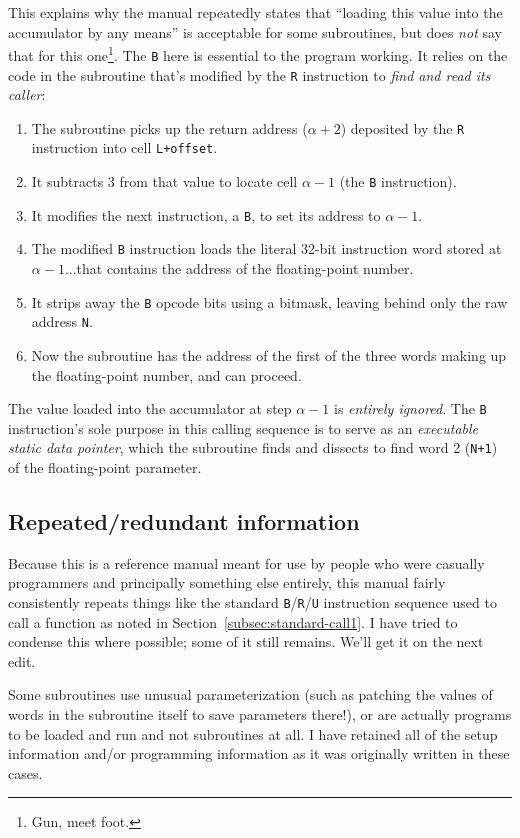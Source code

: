 This explains why the manual repeatedly states that ``loading this value into the accumulator by any means'' is acceptable for some subroutines, but does \emph{not} say that for this one\footnote{Gun, meet foot.}. The \texttt{B} here is essential to the program working. It relies on the code in the subroutine that's modified by the \texttt{R} instruction to \emph{find and read its caller}:
\begin{enumerate}
    \item The subroutine picks up the return address ($\alpha+2$) deposited by the \texttt{R} instruction into cell \texttt{L+offset}.
    \item It subtracts 3 from that value to locate cell $\alpha-1$ (the \texttt{B} instruction).
	\item It modifies the next instruction, a \texttt{B}, to set its address to $\alpha-1$.
    \item The modified \texttt{B} instruction loads the literal 32-bit instruction word stored at $\alpha-1$...that contains the address of the floating-point number.
    \item It strips away the \texttt{B} opcode bits using a bitmask, leaving behind only the raw address \texttt{N}.
	\item Now the subroutine has the address of the first of the three words making up the floating-point number, and can proceed.
\end{enumerate}
The value loaded into the accumulator at step $\alpha-1$ is \emph{entirely ignored}. The \texttt{B} instruction's sole purpose in this calling sequence is to serve as an \emph{executable static data pointer}, which the subroutine finds and dissects to find word 2 (\texttt{N+1}) of the floating-point parameter.

\subsection{Repeated/redundant information}

Because this is a reference manual meant for use by people who were casually programmers and principally something else entirely, this manual fairly consistently repeats things like the standard \texttt{B}/\texttt{R}/\texttt{U} instruction sequence used to call a function as noted in Section~\ref{subsec:standard-call1}. I have tried to condense this where possible; some of it still remains. We'll get it on the next edit.

Some subroutines use unusual parameterization (such as patching the values of words in the subroutine itself to save parameters there!), or are actually programs to be loaded and run and not subroutines at all. I have retained all of the setup information and/or programming information as it was originally written in these cases.

